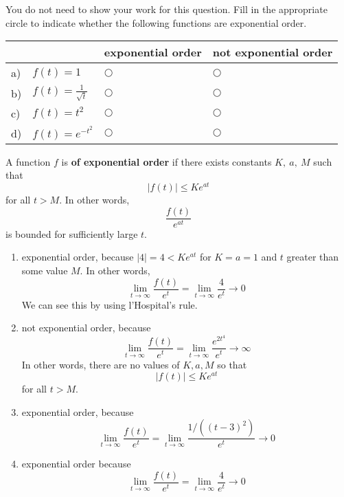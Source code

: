 \ifnum {}
\question[2] You do not need to show your work for this question. Fill in the appropriate circle to indicate whether the following functions are exponential order. 
\vspace{-0.2cm}
\setlength{\extrarowheight}{0.10cm}
\begin{center}
\hspace{-.9cm}\begin{tabular}{ p{0.20cm} p{4cm} p{3.5cm} p{4cm} }
    & & exponential order &  not exponential order  \\[2pt] \hline 
    a) & $f(t) = 1$ & $\bigcirc$  & $\bigcirc$ \\[4pt]  
    b) & $f(t) = \frac{1}{\sqrt t}$  & $\bigcirc$  & $\bigcirc$ \\[4pt]  
    c) & $f(t) = t^2$  & $\bigcirc$  & $\bigcirc$ \\[4pt] 
    d) & $f(t) = e^{-t^2}$  & $\bigcirc$  & $\bigcirc$ \\[4pt] 
    \hline
\end{tabular}
\end{center}
\setlength{\extrarowheight}{0.0cm}
\ifnum {} {\color{DarkBlue} A function 
$f$ is \textbf{of exponential order} if there exists constants $K, \ a, \ M$ such that $$  |f(t)| \leq Ke^{at}  $$ for all $t > M$. In other words, $$ \frac{f(t)}{e^{at}}  $$ is bounded for sufficiently large $t$.
\begin{enumerate}[label=(\alph*)]
    \item exponential order, because $|4| = 4 < Ke^{at}$ for $K=a=1$ and $t$ greater than some value $M$. In other words, $$\lim_{t\to \infty}\frac{f(t)}{e^t} = \lim_{t\to \infty}\frac{4}{e^t} \to 0$$ We can see this by using l'Hospital's rule. 
    \item not exponential order, because 
    $$\lim_{t\to \infty}\frac{f(t)}{e^t} = \lim_{t\to \infty}\frac{e^{2t^4}}{e^t} \to \infty$$ In other words, there are no values of $K,a,M$ so that $$  |f(t)| \leq Ke^{at}  $$ for all $t > M$.
    \item exponential order, because $$\lim_{t\to \infty}\frac{f(t)}{e^t} = \lim_{t\to \infty}\frac{1/((t-3)^2)}{e^t} \to 0$$    
    \item exponential order because $$\lim_{t\to \infty}\frac{f(t)}{e^t} = \lim_{t\to \infty}\frac{4}{e^t} \to 0$$
\end{enumerate}
}
\fi
\vspace{-6pt} 
\fi 




